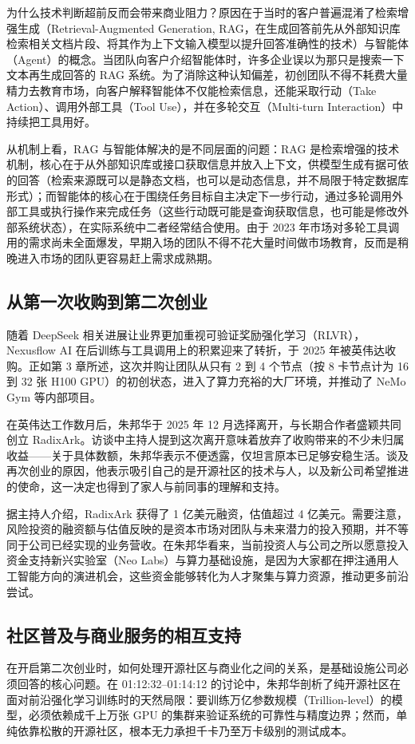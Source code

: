 \documentclass[UTF8,a4paper,11pt,fontset=fandol]{ctexart}
\begin{document}
为什么技术判断超前反而会带来商业阻力？原因在于当时的客户普遍混淆了检索增强生成（Retrieval-Augmented Generation, RAG，在生成回答前先从外部知识库检索相关文档片段、将其作为上下文输入模型以提升回答准确性的技术）与智能体（Agent）的概念。当团队向客户介绍智能体时，许多企业误以为那只是搜索一下文本再生成回答的 RAG 系统。为了消除这种认知偏差，初创团队不得不耗费大量精力去教育市场，向客户解释智能体不仅能检索信息，还能采取行动（Take Action）、调用外部工具（Tool Use），并在多轮交互（Multi-turn Interaction）中持续把工具用好。

从机制上看，RAG 与智能体解决的是不同层面的问题：RAG 是检索增强的技术机制，核心在于从外部知识库或接口获取信息并放入上下文，供模型生成有据可依的回答（检索来源既可以是静态文档，也可以是动态信息，并不局限于特定数据库形式）；而智能体的核心在于围绕任务目标自主决定下一步行动，通过多轮调用外部工具或执行操作来完成任务（这些行动既可能是查询获取信息，也可能是修改外部系统状态），在实际系统中二者经常结合使用。由于 2023 年市场对多轮工具调用的需求尚未全面爆发，早期入场的团队不得不花大量时间做市场教育，反而是稍晚进入市场的团队更容易赶上需求成熟期。

\subsection{从第一次收购到第二次创业}
随着 DeepSeek 相关进展让业界更加重视可验证奖励强化学习（RLVR），Nexusflow AI 在后训练与工具调用上的积累迎来了转折，于 2025 年被英伟达收购。正如第 3 章所述，这次并购让团队从只有 2 到 4 个节点（按 8 卡节点计为 16 到 32 张 H100 GPU）的初创状态，进入了算力充裕的大厂环境，并推动了 NeMo Gym 等内部项目。

在英伟达工作数月后，朱邦华于 2025 年 12 月选择离开，与长期合作者盛颖共同创立 RadixArk。访谈中主持人提到这次离开意味着放弃了收购带来的不少未归属收益——关于具体数额，朱邦华表示不便透露，仅坦言原本已足够安稳生活。谈及再次创业的原因，他表示吸引自己的是开源社区的技术与人，以及新公司希望推进的使命，这一决定也得到了家人与前同事的理解和支持。

据主持人介绍，RadixArk 获得了 1 亿美元融资，估值超过 4 亿美元。需要注意，风险投资的融资额与估值反映的是资本市场对团队与未来潜力的投入预期，并不等同于公司已经实现的业务营收。在朱邦华看来，当前投资人与公司之所以愿意投入资金支持新兴实验室（Neo Labs）与算力基础设施，是因为大家都在押注通用人工智能方向的演进机会，这些资金能够转化为人才聚集与算力资源，推动更多前沿尝试。

\subsection{社区普及与商业服务的相互支持}
在开启第二次创业时，如何处理开源社区与商业化之间的关系，是基础设施公司必须回答的核心问题。在 01:12:32–01:14:12 的讨论中，朱邦华剖析了纯开源社区在面对前沿强化学习训练时的天然局限：要训练万亿参数规模（Trillion-level）的模型，必须依赖成千上万张 GPU 的集群来验证系统的可靠性与精度边界；然而，单纯依靠松散的开源社区，根本无力承担千卡乃至万卡级别的测试成本。
\end{document}
